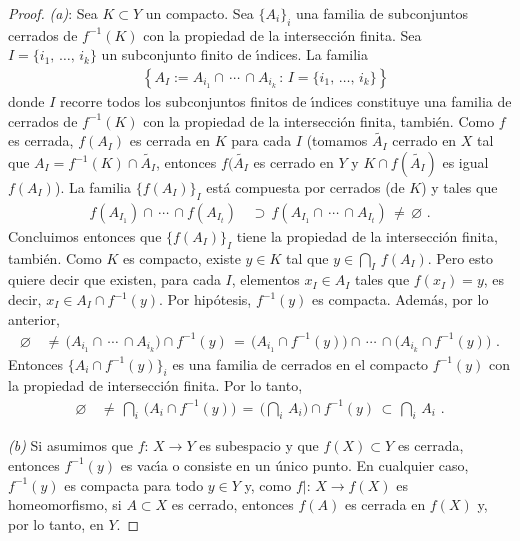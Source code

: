 \begin{proof}
	\emph{(a)}: Sea $K\subset Y$ un compacto. Sea $\{A_{i}\}_{i}$ una
	familia de subconjuntos cerrados de $f^{-1}(K)$ con la propiedad de
	la intersecci\'{o}n finita. Sea $I=\{i_{1},\,\dots,\,i_{k}\}$ un
	subconjunto finito de \'{\i}ndices. La familia
	\begin{align*}
		& \left\lbrace A_{I}:=A_{i_{1}}\cap \,\cdots\,\cap A_{i_{k}}
			\,:\, I=\{i_{1},\,\dots,\,i_{k}\}\right\rbrace
	\end{align*}
	donde $I$ recorre todos los subconjuntos finitos de \'{\i}ndices
	constituye una familia de cerrados de $f^{-1}(K)$ con la propiedad
	de la intersecci\'{o}n finita, tambi\'{e}n. Como $f$ es cerrada,
	$f(A_{I})$ es cerrada en $K$ para cada $I$ (tomamos
	$\widetilde{A_{I}}$ cerrado en $X$ tal que
	$A_{I}=f^{-1}(K)\cap\widetilde{A_{I}}$, entonces $f(\widetilde{A_{I}}$
	es cerrado en $Y$ y $K\cap f(\widetilde{A_{I}})$ es igual $f(A_{I})$).
	La familia $\{f(A_{I})\}_{I}$ est\'{a} compuesta por cerrados (de $K$)
	y tales que
	\begin{align*}
		f(A_{I_{1}})\cap\,\cdots\,\cap f(A_{I_{t}}) & \,\supset\,
			f(A_{I_{1}}\cap\,\cdots\,\cap A_{I_{t}})\,\not=\,
			\varnothing
		\text{ .}
	\end{align*}
	Concluimos entonces que $\{f(A_{I})\}_{I}$ tiene la propiedad de
	la intersecci\'{o}n finita, tambi\'{e}n. Como $K$ es compacto,
	existe $y\in K$ tal que $y\in\bigcap_{I}\,f(A_{I})$. Pero esto
	quiere decir que existen, para cada $I$, elementos $x_{I}\in A_{I}$
	tales que $f(x_{I})=y$, es decir, $x_{I}\in A_{I}\cap f^{-1}(y)$.
	Por hip\'{o}tesis, $f^{-1}(y)$ es compacta. Adem\'{a}s, por lo
	anterior,
	\begin{align*}
		\varnothing & \,\not=\,\big(A_{i_{1}}\cap\,\cdots\,\cap
			A_{i_{k}}\big)\cap f^{-1}(y) \,=\,
			\big(A_{i_{1}}\cap f^{-1}(y)\big) \cap\,\cdots\,\cap
			\big(A_{i_{k}}\cap f^{-1}(y)\big)
		\text{ .}
	\end{align*}
	Entonces $\{A_{i}\cap f^{-1}(y)\}_{i}$ es una familia de cerrados
	en el compacto $f^{-1}(y)$ con la propiedad de intersecci\'{o}n
	finita. Por lo tanto,
	\begin{align*}
		\varnothing & \,\not=\,\bigcap_{i}\,
			\big(A_{i}\cap f^{-1}(y)\big) \,=\,
			\big(\bigcap_{i}\,A_{i}\big)\cap f^{-1}(y)
			\,\subset\, \bigcap_{i}\,A_{i}
		\text{ .}
	\end{align*}

	\emph{(b)} Si asumimos que $f:\, X\rightarrow Y$ es subespacio y
	que $f(X)\subset Y$ es cerrada, entonces $f^{-1}(y)$ es vac\'{\i}a
	o consiste en un \'{u}nico punto. En cualquier caso,
	$f^{-1}(y)$ es compacta para todo $y\in Y$ y, como
	$f|:\,X\rightarrow f(X)$ es homeomorfismo, si $A\subset X$ es cerrado,
	entonces $f(A)$ es cerrada en $f(X)$ y, por lo tanto, en $Y$.


\end{proof}
